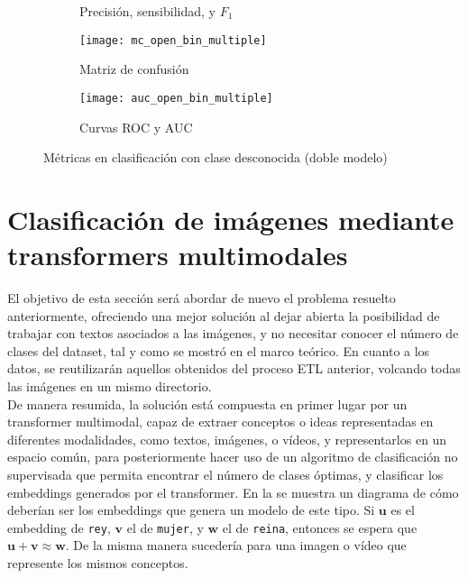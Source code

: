 				\begin{figure}[!h]
					\centering
					\begin{subfigure}{.5\textwidth}
						\centering
						
						\caption{Precisión, sensibilidad, y $F_1$}
						\label{fig:m_open_bin_multiple}
					\end{subfigure}
					\begin{subfigure}{.5\textwidth}
						\centering
						\texttt{[image: mc\_open\_bin\_multiple]}
						\caption{Matriz de confusión}
						\label{fig:mc_open_bin_multiple}
					\end{subfigure}\hfill
					\begin{subfigure}{.5\textwidth}
						\centering
						\texttt{[image: auc\_open\_bin\_multiple]}
						\caption{Curvas ROC y AUC}
						\label{fig:roc_open_bin_multiple}
					\end{subfigure}
					\caption{Métricas en clasificación con clase desconocida (doble modelo)}
					\label{fig:clase_otros_doble}
				\end{figure}
				
		\section{Clasificación de imágenes mediante transformers multimodales}
		
			El objetivo de esta sección será abordar de nuevo el problema resuelto anteriormente, ofreciendo una mejor solución al dejar abierta la posibilidad de trabajar con textos asociados a las imágenes, y no necesitar conocer el número de clases del dataset, tal y como se mostró en el marco teórico. En cuanto a los datos, se reutilizarán aquellos obtenidos del proceso ETL anterior, volcando todas las imágenes en un mismo directorio. \\
			
			De manera resumida, la solución está compuesta en primer lugar por un transformer multimodal, capaz de extraer conceptos o ideas representadas en diferentes modalidades, como textos, imágenes, o vídeos, y representarlos en un espacio común, para posteriormente hacer uso de un algoritmo de clasificación no supervisada que permita encontrar el número de clases óptimas, y clasificar los embeddings generados por el transformer. En la  se muestra un diagrama de cómo deberían ser los embeddings que genera un modelo de este tipo. Si $\textbf{u}$ es el embedding de \texttt{rey}, $\textbf{v}$ el de \texttt{mujer}, y $\textbf{w}$ el de \texttt{reina}, entonces se espera que $\textbf{u} + \textbf{v} \approx \textbf{w}$. De la misma manera sucedería para una imagen o vídeo que represente los mismos conceptos. \\
			
